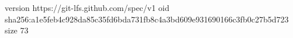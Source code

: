 version https://git-lfs.github.com/spec/v1
oid sha256:a1e5feb4c928da85c35fd6bda731fb8c4a3bd609e931690166c3fb0c27b5d723
size 73
